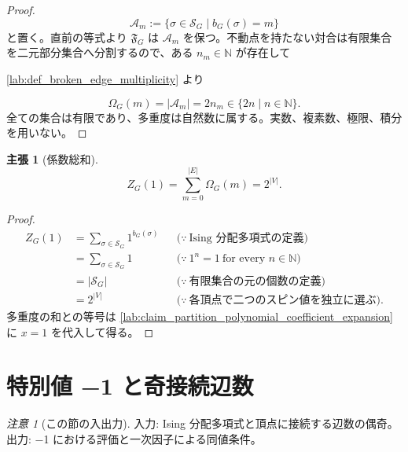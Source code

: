 \documentclass[11pt,a4paper]{article}
\newtheorem{claim}[definition]{主張}
\theoremstyle{remark}
\newtheorem{remark}[definition]{注意}
\begin{document}
\begin{proof}
\[\mathcal A_m:=\{\sigma\in\mathcal S_G\mid b_G(\sigma)=m\}\]
と置く。直前の等式より 
$\mathfrak F_G$
 は 
$\mathcal A_m$
 を保つ。不動点を持たない対合は有限集合を二元部分集合へ分割するので、ある 
$n_m\in\mathbb N$
 が存在して

\cref{lab:def_broken_edge_multiplicity}
 より

\[\Omega_G(m)
=|\mathcal A_m|
=2n_m
\in\{2n\mid n\in\mathbb N\}.\]
全ての集合は有限であり、多重度は自然数に属する。実数、複素数、極限、積分を用いない。

\end{proof}

\begin{claim}[係数総和]\label{lab:claim_partition_polynomial_value_at_one}
\[Z_G(1)=\sum_{m=0}^{|E|}\Omega_G(m)=2^{|V|}.\]
\end{claim}
\begin{proof}
\[\begin{aligned}
Z_G(1)
&=\sum_{\sigma\in\mathcal S_G}1^{b_G(\sigma)}
&&\bigl(\because\ \text{Ising 分配多項式の定義}\bigr)\\
&=\sum_{\sigma\in\mathcal S_G}1
&&\bigl(\because\ 1^n=1\ \text{for every }n\in\mathbb N\bigr)\\
&=|\mathcal S_G|
&&\bigl(\because\ \text{有限集合の元の個数の定義}\bigr)\\
&=2^{|V|}
&&\bigl(\because\ \text{各頂点で二つのスピン値を独立に選ぶ}\bigr).
\end{aligned}\]
多重度の和との等号は 
\cref{lab:claim_partition_polynomial_coefficient_expansion}
 に 
$x=1$
 を代入して得る。

\end{proof}

\section{特別値 −1 と奇接続辺数}

\begin{remark}[この節の入出力]
入力: Ising 分配多項式と頂点に接続する辺数の偶奇。出力: −1 における評価と一次因子による同値条件。

\end{remark}
\end{document}
